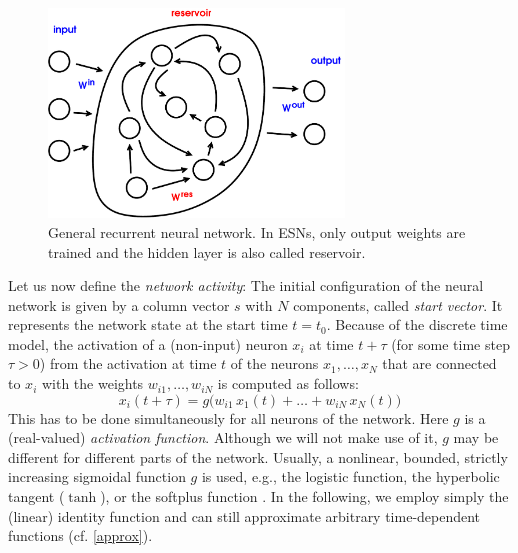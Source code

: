 \documentclass[twoside,11pt]{article}
\theoremstyle{definition}
\begin{document}
\begin{figure}
  \centering
  \includegraphics[width=0.7\textwidth]{fig/net.pdf}
  \caption{General recurrent neural network. In ESNs, only output weights are
	trained and the hidden layer is also called reservoir.}
  \label{net}
\end{figure}

Let us now define the \emph{network activity}: The initial
configuration of the neural network is given by a column vector $s$ with $N$
components, called \emph{start vector}. It represents the network state at the
start time $t=t_0$. Because of the discrete time model, the activation
of a (non-input) neuron $x_i$ at time $t+\tau$ (for some time step $\tau>0$) from
the activation at time $t$ of the neurons $x_1,\dots,x_N$ that are connected to
$x_i$ with the weights $w_{i1},\dots,w_{iN}$ is computed as follows:
\begin{equation}\label{recur}
	x_i(t+\tau) = g\big(w_{i1}\,x_1(t) +\dots+ w_{iN}\,x_N(t)\big)
\end{equation}
This has to be done simultaneously for all neurons of the network. Here $g$ is a
(real-valued) \emph{activation function}. Although we will not make use of it,
$g$ may be different for different parts of the network.
Usually, a nonlinear, bounded, strictly increasing sigmoidal function $g$ is
used, e.g., the logistic function, the hyperbolic tangent ($\tanh$), or the
softplus function \citep[Sect.~3.10]{GBC16}. In the following, we employ simply
the (linear) identity function and can still approximate arbitrary
time-dependent functions (cf. \cref{approx}).
\end{document}
